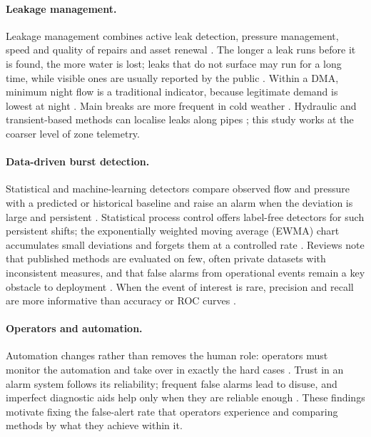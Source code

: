 \documentclass[11pt,a4paper]{article}
\begin{document}
\paragraph{Leakage management.} Leakage management combines active leak detection, pressure management, speed and quality of repairs and asset renewal \cite{farley2003,puust2010}. The longer a leak runs before it is found, the more water is lost; leaks that do not surface may run for a long time, while visible ones are usually reported by the public \cite{lambert2002,farley2003}. Within a DMA, minimum night flow is a traditional indicator, because legitimate demand is lowest at night \cite{farley2003}. Main breaks are more frequent in cold weather \cite{kleiner2001}. Hydraulic and transient-based methods can localise leaks along pipes \cite{colombo2009}; this study works at the coarser level of zone telemetry.

\paragraph{Data-driven burst detection.} Statistical and machine-learning detectors compare observed flow and pressure with a predicted or historical baseline and raise an alarm when the deviation is large and persistent \cite{mounce2010,romano2014}. Statistical process control offers label-free detectors for such persistent shifts; the exponentially weighted moving average (EWMA) chart accumulates small deviations and forgets them at a controlled rate \cite{roberts1959,montgomery2009}. Reviews note that published methods are evaluated on few, often private datasets with inconsistent measures, and that false alarms from operational events remain a key obstacle to deployment \cite{wu2017}. When the event of interest is rare, precision and recall are more informative than accuracy or ROC curves \cite{saito2015}.

\paragraph{Operators and automation.} Automation changes rather than removes the human role: operators must monitor the automation and take over in exactly the hard cases \cite{bainbridge1983}. Trust in an alarm system follows its reliability; frequent false alarms lead to disuse, and imperfect diagnostic aids help only when they are reliable enough \cite{parasuraman1997,wickens2007}. These findings motivate fixing the false-alert rate that operators experience and comparing methods by what they achieve within it.
\end{document}
